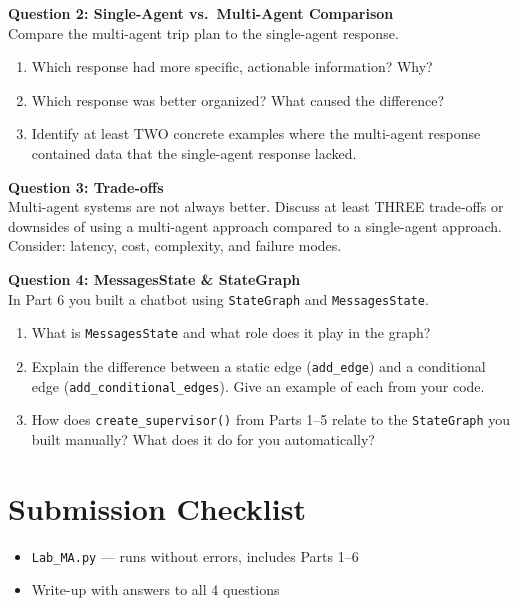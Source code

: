 \documentclass[11pt, letterpaper]{article}
\begin{document}
\bigskip

\noindent\textbf{Question 2: Single-Agent vs.\ Multi-Agent Comparison}\\
Compare the multi-agent trip plan to the single-agent response.
\begin{enumerate}[nosep, label=\alph*)]
  \item Which response had more specific, actionable information? Why?
  \item Which response was better organized? What caused the difference?
  \item Identify at least TWO concrete examples where the multi-agent response contained data that the single-agent response lacked.
\end{enumerate}
\bigskip

\noindent\textbf{Question 3: Trade-offs}\\
Multi-agent systems are not always better. Discuss at least THREE trade-offs or downsides of using a multi-agent approach compared to a single-agent approach. Consider: latency, cost, complexity, and failure modes.

\bigskip

\noindent\textbf{Question 4: MessagesState \& StateGraph}\\
In Part 6 you built a chatbot using \texttt{StateGraph} and \texttt{MessagesState}.
\begin{enumerate}[nosep, label=\alph*)]
  \item What is \texttt{MessagesState} and what role does it play in the graph?
  \item Explain the difference between a static edge (\texttt{add\_edge}) and a conditional edge (\texttt{add\_conditional\_edges}). Give an example of each from your code.
  \item How does \texttt{create\_supervisor()} from Parts 1--5 relate to the \texttt{StateGraph} you built manually? What does it do for you automatically?
\end{enumerate}



\section*{Submission Checklist}

\begin{itemize}[nosep]
  \item[$\square$] \texttt{Lab\_MA.py} --- runs without errors, includes Parts 1--6
  \item[$\square$] Write-up with answers to all 4 questions
\end{itemize}
\end{document}
